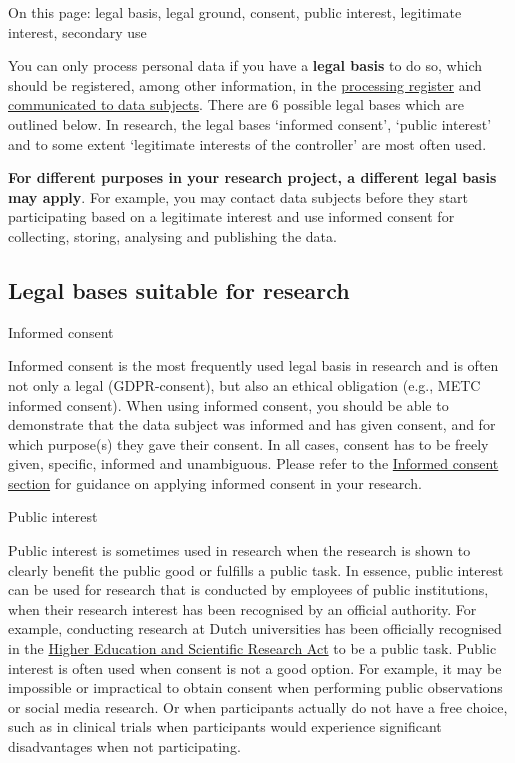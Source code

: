 \documentclass[
]{book}
\begin{document}
On this page: legal basis, legal ground, consent, public interest, legitimate
interest, secondary use

You can only process personal data if you have a \textbf{legal basis} to do so, which
should be registered, among other information, in the
\protect\hyperlink{processing-register}{processing register} and
\protect\hyperlink{privacy-notices}{communicated to data subjects}. There are 6 possible
legal bases which are outlined below. In research, the legal bases `informed
consent', `public interest' and to some extent `legitimate interests of the
controller' are most often used.

\textbf{For different purposes in your research project, a different
legal basis may apply}. For example, you may contact data subjects before they
start participating based on a legitimate interest and use informed consent for
collecting, storing, analysing and publishing the data.

\hypertarget{legal-bases-suitable-for-research}{%
\subsection{Legal bases suitable for research}\label{legal-bases-suitable-for-research}}

Informed consent

Informed consent is the most frequently used legal basis in research and
is often not only a legal (GDPR-consent), but also an ethical obligation
(e.g., METC informed consent). When using informed consent, you should
be able to demonstrate that the data subject was informed and has given
consent, and for which purpose(s) they gave their consent. In all cases,
consent has to be freely given, specific, informed and unambiguous. Please
refer to the \protect\hyperlink{informed-consent-forms}{Informed consent section} for
guidance on applying informed consent in your research.

Public interest

Public interest is sometimes used in research when the research is shown
to clearly benefit the public good or fulfills a public task. In
essence, public interest can be used for research that is conducted by
employees of public institutions, when their research interest has been
recognised by an official authority. For example, conducting research at
Dutch universities has been officially recognised in the
\href{https://wetten.overheid.nl/BWBR0005682/2022-01-01}{Higher Education and Scientific Research Act}
to be a public task. Public interest is often used when consent is not
a good option. For example, it may be impossible or impractical to
obtain consent when performing public observations or social media
research. Or when participants actually do not have a free choice, such
as in clinical trials when participants would experience significant
disadvantages when not participating.
\end{document}
